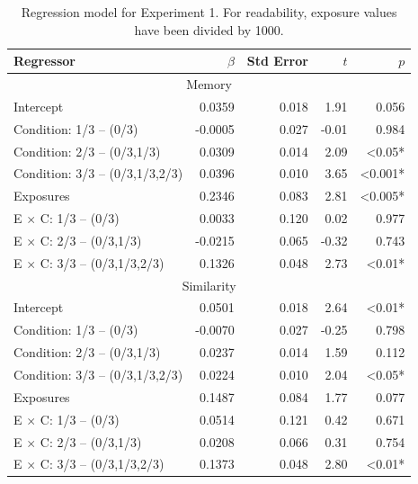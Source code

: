 \documentclass[man,floatsintext]{apa6}
\begin{document}
\newcommand{\ww}{\color{white}{*}} \newcommand\T{\rule{0pt}{2.1ex}}

\begin{table}[ht]
  \caption{Regression model for Experiment 1. For readability, exposure values have been divided by 1000.}
  \label{expt1-regressions} 
  \begin{center}
  \footnotesize{
    \begin{tabular}{l r r r r}
      \hline
      Regressor & $\beta$ & Std Error & $t$ & $p$ \\ \hline
      \multicolumn{5}{c}{\T Memory \T}\\
      Intercept &  0.0359 &  0.018 &  1.91 & 0.056\ww\\
      Condition: 1/3 -- (0/3) & -0.0005 &  0.027 & -0.01 & 0.984\ww\\
      Condition: 2/3 -- (0/3,1/3) &  0.0309 &  0.014 &  2.09 & <0.05*\\
      Condition: 3/3 -- (0/3,1/3,2/3) &  0.0396 &  0.010 &  3.65 & <0.001*\\
      Exposures &  0.2346 &  0.083 &  2.81 & <0.005*\\
      E $\times$ C: 1/3 -- (0/3) &  0.0033 &  0.120 &  0.02 & 0.977\ww\\
      E $\times$ C: 2/3 -- (0/3,1/3) & -0.0215 &  0.065 & -0.32 & 0.743\ww\\
      E $\times$ C: 3/3 -- (0/3,1/3,2/3) &  0.1326 &  0.048 &  2.73 & <0.01* \\
      \hline

      \multicolumn{5}{c}{\T Similarity \T}\\
      Intercept &  0.0501 &  0.018 &  2.64 & <0.01*\\
      Condition: 1/3 -- (0/3) & -0.0070 &  0.027 & -0.25 & 0.798\ww\\
      Condition: 2/3 -- (0/3,1/3) &  0.0237 &  0.014 &  1.59 & 0.112\ww\\
      Condition: 3/3 -- (0/3,1/3,2/3) &  0.0224 &  0.010 &  2.04 & <0.05*\\
      Exposures &  0.1487 &  0.084 &  1.77 & 0.077\ww\\
      E $\times$ C: 1/3 -- (0/3) &  0.0514 &  0.121 &  0.42 & 0.671\ww\\
      E $\times$ C: 2/3 -- (0/3,1/3) &  0.0208 &  0.066 &  0.31 & 0.754\ww\\
      E $\times$ C: 3/3 -- (0/3,1/3,2/3) &  0.1373 &  0.048 &  2.80 & <0.01* \\
      \hline


\end{tabular}}
\end{center}
\end{table}
\end{document}
